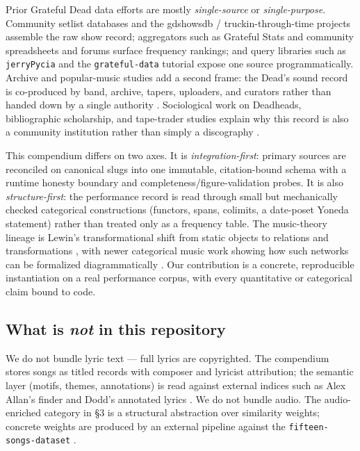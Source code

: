 \documentclass[
]{article}
\begin{document}
Prior Grateful Dead data efforts are mostly \emph{single-source} or
\emph{single-purpose}. Community setlist databases and the gdshowsdb /
truckin-through-time projects
\citep{gdshowsdb, noah_truckin_through_time} assemble the raw show
record; aggregators such as Grateful Stats \citep{grateful_stats} and
community spreadsheets and forums
\citep{reddit_setlist_db, reddit_data_sets} surface frequency rankings;
and query libraries such as \texttt{jerryPycia} \citep{jerry_pycia} and
the \texttt{grateful-data} tutorial \citep{grateful_data_tutorial}
expose one source programmatically. Archive and popular-music studies
add a second frame: the Dead's sound record is co-produced by band,
archive, tapers, uploaders, and curators rather than handed down by a
single authority
\citep{wallace_cocreation_sound_archive, dead_net_taping_dead, internet_archive_gd_collection_policy, brackett_live_dead}.
Sociological work on Deadheads, bibliographic scholarship, and
tape-trader studies explain why this record is also a community
institution rather than simply a discography
\citep{adams_deadhead_social_science, dodd_weiner_annotated_bibliography, marshall_bootleg_collectors, jstor_daily_tape_trading}.

This compendium differs on two axes. It is \emph{integration-first}:
primary sources are reconciled on canonical slugs into one immutable,
citation-bound schema with a runtime honesty boundary and
completeness/figure-validation probes. It is also
\emph{structure-first}: the performance record is read through small but
mechanically checked categorical constructions (functors, spans,
colimits, a date-poset Yoneda statement) rather than treated only as a
frequency table. The music-theory lineage is Lewin's transformational
shift from static objects to relations and transformations
\citep{lewin_gmit}, with newer categorical music work showing how such
networks can be formalized diagrammatically
\citep{padi_category_music_case_study, popoff_hidden_categories}. Our
contribution is a concrete, reproducible instantiation on a real
performance corpus, with every quantitative or categorical claim bound
to code.

\subsection{\texorpdfstring{What is \emph{not} in this
repository}{What is not in this repository}}\label{what-is-not-in-this-repository}

We do not bundle lyric text --- full lyrics are copyrighted. The
compendium stores songs as titled records with composer and lyricist
attribution; the semantic layer (motifs, themes, annotations) is read
against external indices such as Alex Allan's finder and Dodd's
annotated lyrics \citep{whitegum_alex_allan, dodd_annotated_lyrics}. We
do not bundle audio. The audio-enriched category in §3 is a structural
abstraction over similarity weights; concrete weights are produced by an
external pipeline against the \texttt{fifteen-songs-dataset}
\citep{fifteen_songs_dataset}.
\end{document}
